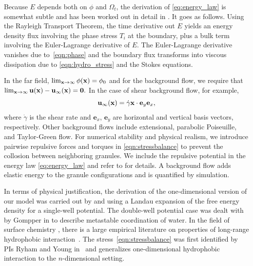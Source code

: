 Because $E$ depends both on $\phi$ and $\Omega_t$,
the derivation of \eqref{eq:energy_law}
is somewhat subtle and has been worked out in detail in \cite{Fu2018_SIAM}.
It goes as follows.
Using the Rayleigh Transport Theorem, 
the time derivative out $E$ yields an energy
density flux involving the phase stress $T_i$
at the boundary, plus a bulk term involving 
the Euler-Lagrange derivative of $E.$
The Euler-Lagrange derivative vanishes due to~\eqref{eqn:phase}
and the boundary flux transforms into viscous dissipation due to 
\eqref{eqn:hydro_stress} and the Stokes equations. 

In the far field, $\lim_{\mathbf{x} \to \infty} \phi(\mathbf{x}) = \phi_0$
and for the background flow, we require that
$\lim_{\mathbf{x} \to \infty} \mathbf{u}(\mathbf{x}) - \mathbf{u}_{\infty}(\mathbf{x}) = \mathbf{0}.$ 
In the case of shear background flow, for example,
\begin{equation}
\label{eqn:shear_BG_flow}
\mathbf{u}_{\infty}(\mathbf{x}) = \dot{\gamma} \mathbf{x} \cdot \mathbf{e}_y \mathbf{e}_x,
\end{equation}
where $\dot \gamma$ is the shear rate and
$\mathbf{e}_x$, $\mathbf{e}_y$ are horizontal and vertical
basis vectors, respectively.  Other background flows include
extensional, parabolic Poiseuille, and Taylor-Green flow.
For numerical stability and physical realism,
we introduce pairwise repulsive forces and torques in \eqref{eqn:stressbalance}
to prevent the collosion between neighboring granules.
We include the repulsive potential in the energy law \eqref{eq:energy_law} 
and refer to \cite{FuQuRyYo22,fu-ryh-qua-you2022,Fu2018_SIAM} for details.
A background flow adds elastic energy to the granule configurations
and is quantified by simulation.

In terms of physical justification, the
derivation of the one-dimensional version of our model
was carried out by \cite{MaRa76} and \cite{ErLjCl89}
using a Landau expansion of the
free energy density for a single-well potential.
The double-well potential case was dealt with by
Gompper in \cite{GoHaKo94} to describe metastable coordination of water.
In the field of surface chemistry \cite{Israelachvili1954},
there is a large empirical literature on properties of
long-range hydrophobic interaction~\cite{LeRaPa77,KoNa15,
Nagle17,Lum1999, Lin2005, Meyer2006, Ducker2016,Jackson2016,Gletal88,Aketal17,Ch05}.
The stress~\eqref{eqn:stressbalance} was first
identified by PIs Ryham and Young in~\cite{Fu2018_SIAM}
and generalizes one-dimensional hydrophobic interaction to
the $n$-dimensional setting. 

